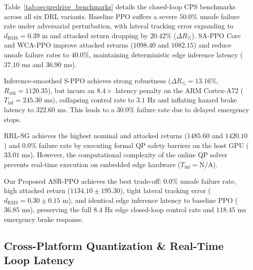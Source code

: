\documentclass[conference]{IEEEtran}
\begin{document}
Table~\ref{tab:securedrive_benchmarks} details the closed-loop CPS benchmarks across all six DRL variants. Baseline PPO suffers a severe $50.0\%$ unsafe failure rate under adversarial perturbation, with lateral tracking error expanding to $d_{\text{RMS}} = 0.39\text{ m}$ and attacked return dropping by $20.42\%$ ($\Delta R_\%$). SA-PPO Core and WCA-PPO improve attacked returns ($1098.40$ and $1082.15$) and reduce unsafe failure rates to $40.0\%$, maintaining deterministic edge inference latency ($37.10\text{ ms}$ and $36.90\text{ ms}$).

Inference-smoothed S-PPO achieves strong robustness ($\Delta R_\% = 13.16\%$, $R_{\text{atk}} = 1120.35$), but incurs an $8.4\times$ latency penalty on the ARM Cortex-A72 ($T_{\text{inf}} = 245.30\text{ ms}$), collapsing control rate to $3.1\text{ Hz}$ and inflating hazard brake latency to $322.60\text{ ms}$. This leads to a $30.0\%$ failure rate due to delayed emergency stops.

RRL-SG achieves the highest nominal and attacked returns ($1485.60$ and $1420.10$) and $0.0\%$ failure rate by executing formal QP safety barriers on the host GPU ($33.01\text{ ms}$). However, the computational complexity of the online QP solver prevents real-time execution on embedded edge hardware ($T_{\text{inf}} = \text{N/A}$).

Our Proposed ASR-PPO achieves the best trade-off: $0.0\%$ unsafe failure rate, high attacked return ($1134.10 \pm 195.30$), tight lateral tracking error ($d_{\text{RMS}} = 0.30 \pm 0.15\text{ m}$), and identical edge inference latency to baseline PPO ($36.85\text{ ms}$), preserving the full $8.4\text{ Hz}$ edge closed-loop control rate and $118.45\text{ ms}$ emergency brake response.

\subsection{Cross-Platform Quantization \& Real-Time Loop Latency}
\end{document}
